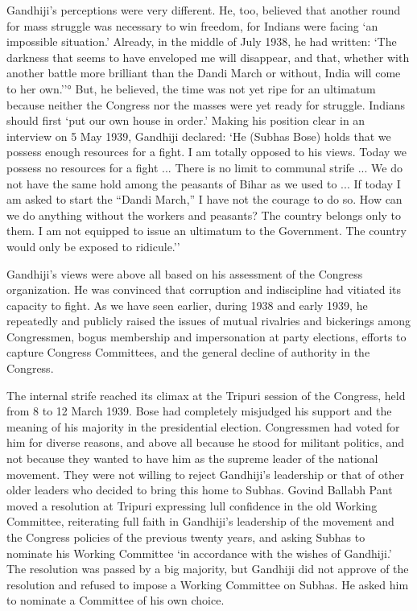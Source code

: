 \begin{multicols}{2}
Gandhiji's perceptions were very different. He, too, believed that another round for mass struggle was necessary to win freedom, for Indians were facing `an impossible situation.' Already, in the middle of July 1938, he had written: `The darkness that seems to have enveloped me will disappear, and that, whether with another battle more brilliant than the Dandi March or without, India will come to her own.''° But, he believed, the time was not yet ripe for an ultimatum because neither the Congress nor the masses were yet ready for struggle. Indians should first `put our own house in order.' Making his position clear in an interview on 5 May 1939, Gandhiji declared: `He (Subhas Bose) holds that we possess enough resources for a fight. I am totally opposed to his views. Today we possess no resources for a fight ... There is no limit to communal strife ... We do not have the same hold among the peasants of Bihar as we used to ... If today I am asked to start the ``Dandi March,'' I have not the courage to do so. How can we do anything without the workers and peasants? The country belongs only to them. I am not equipped to issue an ultimatum to the Government. The country would only be exposed to ridicule.'' 

Gandhiji's views were above all based on his assessment of the Congress organization. He was convinced that corruption and indiscipline had vitiated its capacity to fight. As we have seen earlier, during 1938 and early 1939, he repeatedly and publicly raised the issues of mutual rivalries and bickerings among Congressmen, bogus membership and impersonation at party elections, efforts to capture Congress Committees, and the general decline of authority in the Congress. 

The internal strife reached its climax at the Tripuri session of the Congress, held from 8 to 12 March 1939. Bose had completely misjudged his support and the meaning of his majority in the presidential election. Congressmen had voted for him for diverse reasons, and above all because he stood for militant politics, and not because they wanted to have him as the supreme leader of the national movement. They were not willing to reject Gandhiji's leadership or that of other older leaders who decided to bring this home to Subhas. Govind Ballabh Pant moved a resolution at Tripuri expressing lull confidence in the old Working Committee, reiterating full faith in Gandhiji's leadership of the movement and the Congress policies of the previous twenty years, and asking Subhas to nominate his Working Committee `in accordance with the wishes of Gandhiji.' The resolution was passed by a big majority, but Gandhiji did not approve of the resolution and refused to impose a Working Committee on Subhas. He asked him to nominate a Committee of his own choice. 


\end{multicols}

